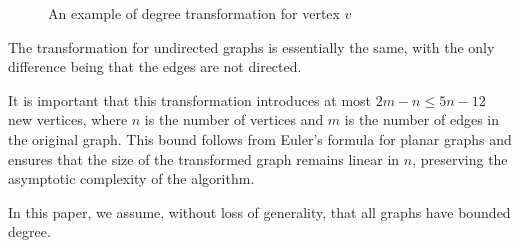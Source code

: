 \begin{figure}[h]

  \centering{}
  \caption{An example of degree transformation for vertex $v$}
  \label{Figure:example}
\end{figure}

The transformation for undirected graphs is essentially the same, with the only difference being that the edges are not directed.

It is important that this transformation introduces at most $2m - n \leq 5n - 12$ new vertices, where $n$ is the number of vertices and $m$ is the number of edges in the original graph. This bound follows from Euler's formula for planar graphs and ensures that the size of the transformed graph remains linear in $n$, preserving the asymptotic complexity of the algorithm.
 
In this paper, we assume, without loss of generality, that all graphs have bounded degree.
